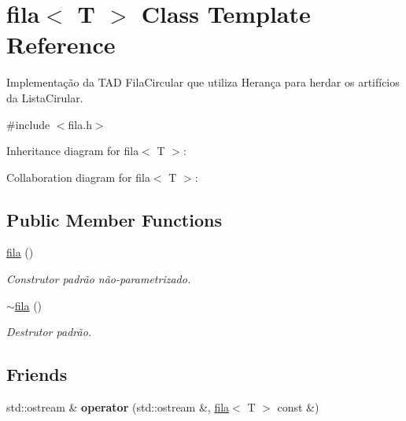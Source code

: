 \hypertarget{classfila}{}\section{fila$<$ T $>$ Class Template Reference}
\label{classfila}


Implementação da T\+AD Fila\+Circular que utiliza Herança para herdar os artifícios da Lista\+Cirular.  




{\ttfamily \#include $<$fila.\+h$>$}



Inheritance diagram for fila$<$ T $>$\+:


Collaboration diagram for fila$<$ T $>$\+:
\subsection*{Public Member Functions}
\begin{DoxyCompactItemize}
\item 
\hyperlink{classfila_a3de0e8cec2c8d5cb805a69f80d1adab7}{fila} ()\hypertarget{classfila_a3de0e8cec2c8d5cb805a69f80d1adab7}{}\label{classfila_a3de0e8cec2c8d5cb805a69f80d1adab7}

\begin{DoxyCompactList}\small\item\em Construtor padrão não-\/parametrizado. \end{DoxyCompactList}\item 
\hyperlink{classfila_a2836749b9d2128ae465065afe4a8d71e}{$\sim$fila} ()\hypertarget{classfila_a2836749b9d2128ae465065afe4a8d71e}{}\label{classfila_a2836749b9d2128ae465065afe4a8d71e}

\begin{DoxyCompactList}\small\item\em Destrutor padrão. \end{DoxyCompactList}\end{DoxyCompactItemize}
\subsection*{Friends}
\begin{DoxyCompactItemize}
\item 
std\+::ostream \& {\bfseries operator} (std\+::ostream \&, \hyperlink{classfila}{fila}$<$ T $>$ const \&)\hypertarget{classfila_a16804deb7a3840ade8bf1d6d27850254}{}\label{classfila_a16804deb7a3840ade8bf1d6d27850254}

\end{DoxyCompactItemize}
